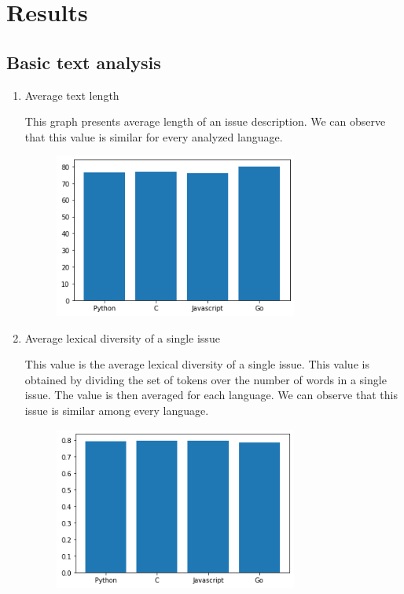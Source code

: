 \documentclass[]{article}
\begin{document}
\section{Results}
\subsection{Basic text analysis}
\begin{enumerate}
    \item Average text length

          This graph presents average length of an issue description. We can observe that this value is similar for every analyzed language.


          \begin{figure}[H]
              \includegraphics[width=8cm]{avg_len.png}
              \centering
          \end{figure}

    \item Average lexical diversity of a single issue

          This value is the average lexical diversity of a single issue. This value is obtained by dividing the set of tokens over the number of words in a single issue. The value is then averaged for each language. We can observe that this issue is similar among every language.

          \begin{figure}[H]
              \includegraphics[width=8cm]{lex_div_single.png}
              \centering
          \end{figure}


\end{enumerate}
\end{document}
